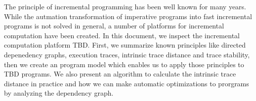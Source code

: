 The principle of incremental programming has been well known for many years. While the autmation transformation of imperative programs into fast incremental programs is not solved in general, a number of platforms for incremental computation have been created. In this document, we inspect the incremental computation platform TBD. First, we summarize known principles like directed depenedency graphs, execution traces, intrinsic trace distance and trace stability, then we create an program model which enables us to apply those principles to TBD programs. We also present an algorithm to calculate the intrinsic trace distance in practice and how we can make automatic optimizations to prorgrams by analyzing the dependency graph. 